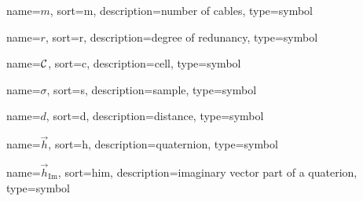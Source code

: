 	{%
		name=\ensuremath{m},
		sort=m,
		description=number of cables,
		type=symbol
	}
	\newcommand{\numcables}{\gls{sym:numcables}}

	{%
		name=\ensuremath{r},
		sort=r,
		description=degree of redunancy,
		type=symbol
	}
	\newcommand{\degofredundancy}{\gls{sym:degofredundancy}}

	{%
		name=\ensuremath{\set{C}},
		sort=c,
		description=cell,
		type=symbol
	}
	\newcommand{\cell}{\gls{sym:cell}}

	{%
		name=\ensuremath{\sigma},
		sort=s,
		description=sample,
		type=symbol
	}
	\newcommand{\sample}{\gls{sym:sample}}

	{%
		name=\ensuremath{d},
		sort=d,
		description=distance,
		type=symbol
	}
	\newcommand{\distance}{\gls{sym:distance}}

	{%
		name=\ensuremath{\vec{h}},
		sort=h,
		description=quaternion,
		type=symbol
	}
	\newcommand{\quaternion}{\gls{sym:quaternion}}

	{%
		name=\ensuremath{\vec{h}_{\mathrm{Im}}}, %
		sort=him,
		description=imaginary vector part of a quaterion,
		type=symbol
	}
	\newcommand{\quaternionimg}{\gls{sym:quaternionimg}}

